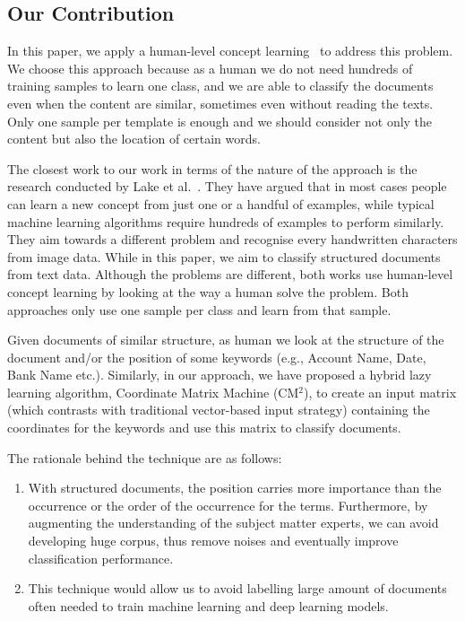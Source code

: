 \subsection{Our Contribution}
In this paper, we apply a human-level concept learning~\cite{lake2015} to address this problem. We choose this approach because as a human we do not need hundreds of training samples to learn one class, and we are able to classify the documents even when the content are similar, sometimes even without reading the texts. Only one sample per template is enough and we should consider not only the content but also the location of certain words.

The closest work to our work in terms of the nature of the approach is the research conducted by Lake et al.~\cite{lake2015}. They have argued that in most cases people can learn a new concept from just one or a handful of examples, while typical machine learning algorithms require hundreds of examples to perform similarly. They aim towards a different problem and recognise every handwritten characters from image data. While in this paper, we aim to classify structured documents from text data. Although the problems are different, both works use human-level concept learning by looking at the way a human solve the problem. Both approaches only use one sample per class and learn from that sample.

Given documents of similar structure, as human we look at the structure of the document and/or the position of some keywords (e.g., Account Name, Date, Bank Name etc.). Similarly, in our approach, we have proposed a hybrid lazy learning algorithm, Coordinate Matrix Machine (CM$^2$), to create an input matrix (which contrasts with traditional vector-based input strategy) containing the coordinates for the keywords and use this matrix to classify documents.

The rationale behind the technique are as follows:
\begin{enumerate}
\item With structured documents, the position carries more importance than the occurrence or the order of the occurrence for the terms. Furthermore, by augmenting the understanding of the subject matter experts, we can avoid developing huge corpus, thus remove noises and eventually improve classification performance.
\item This technique would allow us to avoid labelling large amount of documents often needed to train machine learning and deep learning models.
\end{enumerate}

